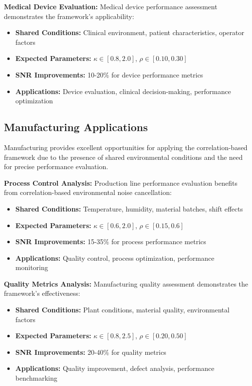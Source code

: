 \textbf{Medical Device Evaluation:}
Medical device performance assessment demonstrates the framework's applicability:
\begin{itemize}
    \item \textbf{Shared Conditions:} Clinical environment, patient characteristics, operator factors
    \item \textbf{Expected Parameters:} $\kappa \in [0.8, 2.0]$, $\rho \in [0.10, 0.30]$
    \item \textbf{SNR Improvements:} 10-20\% for device performance metrics
    \item \textbf{Applications:} Device evaluation, clinical decision-making, performance optimization
\end{itemize}

\subsection{Manufacturing Applications}

Manufacturing provides excellent opportunities for applying the correlation-based framework due to the presence of shared environmental conditions and the need for precise performance evaluation.

\textbf{Process Control Analysis:}
Production line performance evaluation benefits from correlation-based environmental noise cancellation:
\begin{itemize}
    \item \textbf{Shared Conditions:} Temperature, humidity, material batches, shift effects
    \item \textbf{Expected Parameters:} $\kappa \in [0.6, 2.0]$, $\rho \in [0.15, 0.6]$
    \item \textbf{SNR Improvements:} 15-35\% for process performance metrics
    \item \textbf{Applications:} Quality control, process optimization, performance monitoring
\end{itemize}

\textbf{Quality Metrics Analysis:}
Manufacturing quality assessment demonstrates the framework's effectiveness:
\begin{itemize}
    \item \textbf{Shared Conditions:} Plant conditions, material quality, environmental factors
    \item \textbf{Expected Parameters:} $\kappa \in [0.8, 2.5]$, $\rho \in [0.20, 0.50]$
    \item \textbf{SNR Improvements:} 20-40\% for quality metrics
    \item \textbf{Applications:} Quality improvement, defect analysis, performance benchmarking
\end{itemize}

